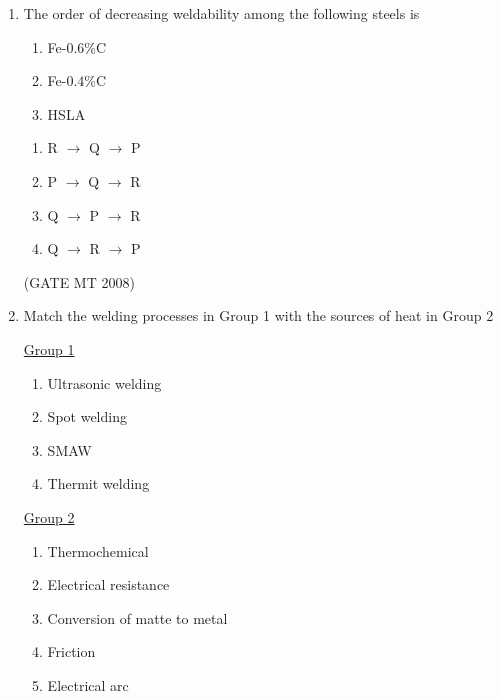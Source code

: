 \documentclass[11pt, letterpaper]{article}
\theoremstyle{remark}
\begin{document}
\begin{enumerate}
\begin{multicols}{2}
\begin{enumerate} 
\item P, Q
\item Q, S
\item Q, T
\item P, S
\end{enumerate}
\end{multicols}
\hfill(GATE MT 2008)
\item The order of decreasing weldability among the following steels is
\begin{enumerate}[label=(\MakeUppercase{\alph*}), start= 16]
\item Fe-$0.6$\%C
\item Fe-$0.4$\%C
\item HSLA
\end{enumerate}

\begin{multicols}{2}
\begin{enumerate} 
\item R $\rightarrow$ Q $\rightarrow$ P
\item P $\rightarrow$ Q $\rightarrow$ R
\item Q $\rightarrow$ P $\rightarrow$ R
\item Q $\rightarrow$ R $\rightarrow$ P
\end{enumerate}
\end{multicols}
\hfill(GATE MT 2008)
\item Match the welding processes in Group 1 with the sources of heat in Group 2

\begin{multicols}{2}
\underline{Group 1}
\begin{enumerate}[label=(\Alph*), start=16]
\item Ultrasonic welding
\item Spot welding
\item SMAW
\item Thermit welding
\end{enumerate}

\underline{Group 2}
\begin{enumerate}[label=(\arabic*), start=1]
\item Thermochemical 
\item Electrical resistance
\item Conversion of matte to metal
\item Friction
\item Electrical arc
\end{enumerate}
\end{multicols}


\end{enumerate}
\end{document}
